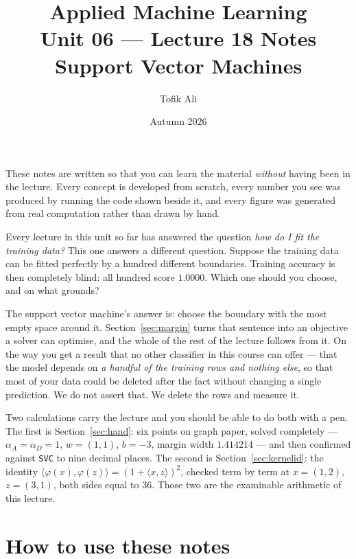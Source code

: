 \documentclass[11pt]{article}
\title{Applied Machine Learning\\Unit 06 --- Lecture 18 Notes\\
       Support Vector Machines}
\author{Tofik Ali}
\date{Autumn 2026}
\begin{document}
\maketitle

\begin{keyidea}
These notes are written so that you can learn the material \emph{without}
having been in the lecture. Every concept is developed from scratch, every
number you see was produced by running the code shown beside it, and every
figure was generated from real computation rather than drawn by hand.

Every lecture in this unit so far has answered the question \emph{how do I
fit the training data?} This one answers a different question. Suppose the
training data can be fitted perfectly by a hundred different boundaries.
Training accuracy is then completely blind: all hundred score $1.0000$. Which
one should you choose, and on what grounds?

The support vector machine's answer is: choose the boundary with the most
empty space around it. Section~\ref{sec:margin} turns that sentence into an
objective a solver can optimise, and the whole of the rest of the lecture
follows from it. On the way you get a result that no other classifier in this
course can offer --- that the model depends on \emph{a handful of the training
rows and nothing else}, so that most of your data could be deleted after the
fact without changing a single prediction. We do not assert that. We delete
the rows and measure it.

Two calculations carry the lecture and you should be able to do both with a
pen. The first is Section~\ref{sec:hand}: six points on graph paper, solved
completely --- $\alpha_A = \alpha_D = 1$, $w = (1,1)$, $b = -3$, margin width
$\mathbf{1.414214}$ --- and then confirmed against \texttt{SVC} to nine
decimal places. The second is Section~\ref{sec:kernelid}: the identity
$\langle\varphi(x),\varphi(z)\rangle = (1 + \langle x,z\rangle)^2$, checked
term by term at $x = (1,2)$, $z = (3,1)$, both sides equal to $36$. Those two
are the examinable arithmetic of this lecture.
\end{keyidea}

\tableofcontents
\medskip

\section{How to use these notes}
\label{sec:how}
\end{document}
